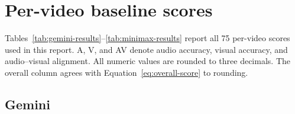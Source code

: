 \documentclass{article}
\begin{document}




\appendix

\section{Per-video baseline scores}
\label{app:per-video}

Tables~\ref{tab:gemini-results}--\ref{tab:minimax-results} report all 75 per-video scores used in this report. A, V, and AV denote audio accuracy, visual accuracy, and audio--visual alignment. All numeric values are rounded to three decimals. The overall column agrees with Equation~\eqref{eq:overall-score} to rounding.

\subsection{Gemini}
\end{document}
